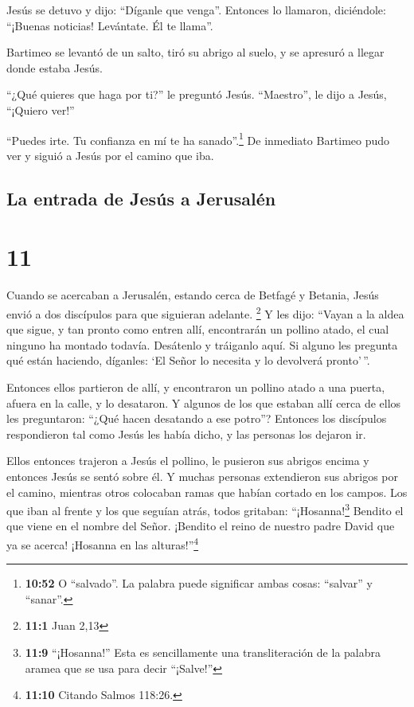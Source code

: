  Jesús se detuvo y dijo: ``Díganle que venga''. Entonces
lo llamaron, diciéndole: ``¡Buenas noticias! Levántate. Él te llama''.

 Bartimeo se levantó de un salto, tiró su abrigo al
suelo, y se apresuró a llegar donde estaba Jesús.

 ``¿Qué quieres que haga por ti?'' le preguntó Jesús.
``Maestro'', le dijo a Jesús, ``¡Quiero ver!''

 ``Puedes irte. Tu confianza en mí te ha
sanado''.\footnote{\textbf{10:52} O ``salvado''. La palabra puede
  significar ambas cosas: ``salvar'' y ``sanar''.} De inmediato Bartimeo
pudo ver y siguió a Jesús por el camino que iba.

\hypertarget{la-entrada-de-jesuxfas-a-jerusaluxe9n}{%
\subsection{La entrada de Jesús a
Jerusalén}\label{la-entrada-de-jesuxfas-a-jerusaluxe9n}}

\hypertarget{section-10}{%
\section{11}\label{section-10}}

 Cuando se acercaban a Jerusalén, estando cerca de Betfagé
y Betania, Jesús envió a dos discípulos para que siguieran adelante.
\footnote{\textbf{11:1} Juan 2,13}  Y les dijo: ``Vayan a
la aldea que sigue, y tan pronto como entren allí, encontrarán un
pollino atado, el cual ninguno ha montado todavía. Desátenlo y tráiganlo
aquí.  Si alguno les pregunta qué están haciendo,
díganles: `El Señor lo necesita y lo devolverá pronto'\,''.

 Entonces ellos partieron de allí, y encontraron un
pollino atado a una puerta, afuera en la calle, y lo desataron.
 Y algunos de los que estaban allí cerca de ellos les
preguntaron: ``¿Qué hacen desatando a ese potro''? 
Entonces los discípulos respondieron tal como Jesús les había dicho, y
las personas los dejaron ir.

 Ellos entonces trajeron a Jesús el pollino, le pusieron
sus abrigos encima y entonces Jesús se sentó sobre él.  Y
muchas personas extendieron sus abrigos por el camino, mientras otros
colocaban ramas que habían cortado en los campos.  Los que
iban al frente y los que seguían atrás, todos gritaban:
``¡Hosanna!\footnote{\textbf{11:9} ``¡Hosanna!'' Esta es sencillamente
  una transliteración de la palabra aramea que se usa para decir
  ``¡Salve!''} Bendito el que viene en el nombre del Señor.
 ¡Bendito el reino de nuestro padre David que ya se
acerca! ¡Hosanna en las alturas!''\footnote{\textbf{11:10} Citando
  Salmos 118:26.}

